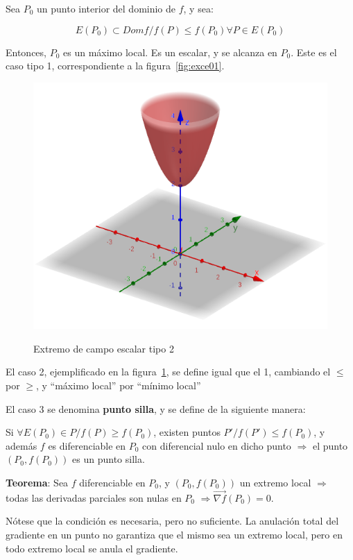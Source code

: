 \documentclass{article}
\begin{document}

Sea $P_0$ un punto interior del dominio de $f$, y sea:

\begin{equation}
E(P_0) \subset Dom f / f(P) \leq f(P_0) \forall P \in E(P_0)
\end{equation}

Entonces, $P_0$ es un máximo local. Es un escalar, y se alcanza en $P_0$. Este es el caso tipo 1, correspondiente a la figura~\ref{fig:exce01}. 

\begin{figure}[h]
\caption{Extremo de campo escalar tipo 2}
\includegraphics[scale=0.6]{img/teo_fig010_exce02.png} 
\centering
\label{fig:exce02}
\end{figure}

El caso 2, ejemplificado en la figura~\ref{fig:exce02}, se define igual que el 1, cambiando el $\leq$ por $\geq$, y ``máximo local'' por ``mínimo local''

El caso 3 se denomina \textbf{punto silla}, y se define de la siguiente manera:

Si $\forall E(P_0) \in P / f(P) \geq f(P_0)$, existen puntos $P' / f(P') \leq f(P_0)$, y además $f$ es diferenciable en $P_0$ con diferencial nulo en dicho punto $\Rightarrow$ el punto $(P_0, f(P_0))$ es un punto silla.

\textbf{Teorema}: Sea $f$ diferenciable en $P_0$, y $(P_0, f(P_0))$ un extremo local $\Rightarrow$ todas las derivadas parciales son nulas en $P_0$ $\Rightarrow \overrightarrow{\nabla f}(P_0) = 0$.

Nótese que la condición es necesaria, pero no suficiente. La anulación total del gradiente en un punto no garantiza que el mismo sea un extremo local, pero en todo extremo local se anula el gradiente.
\end{document}
